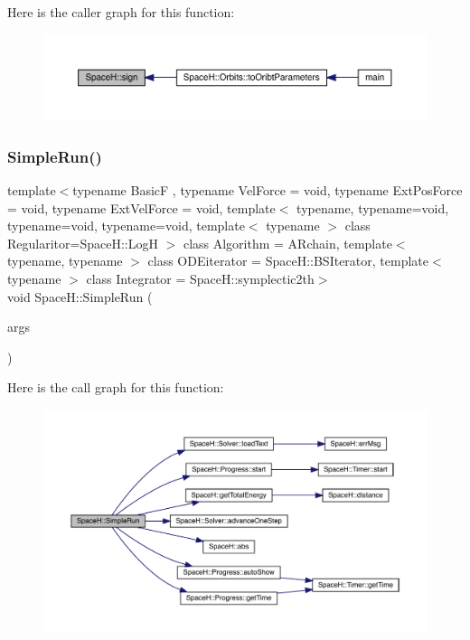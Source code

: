 Here is the caller graph for this function\+:
\nopagebreak
\begin{figure}[H]
\begin{center}
\leavevmode
\includegraphics[width=350pt]{namespace_space_h_a14683e2d8fb2395aa4821be534fb8b15_icgraph}
\end{center}
\end{figure}
\mbox{\label{namespace_space_h_aadf57dac888f5b6e80de5ef3f27733dc}} 
\subsubsection{\texorpdfstring{Simple\+Run()}{SimpleRun()}}
{\footnotesize\ttfamily template$<$typename BasicF , typename Vel\+Force  = void, typename Ext\+Pos\+Force  = void, typename Ext\+Vel\+Force  = void, template$<$ typename, typename=void, typename=void, typename=void, template$<$ typename $>$ class Regularitor=\+Space\+H\+::\+Log\+H $>$ class Algorithm = A\+Rchain, template$<$ typename, typename $>$ class O\+D\+Eiterator = Space\+H\+::\+B\+S\+Iterator, template$<$ typename $>$ class Integrator = Space\+H\+::symplectic2th$>$ \\
void Space\+H\+::\+Simple\+Run (\begin{DoxyParamCaption}\item[{\mbox{\hyperlink{struct_space_h_1_1_run_args}{Run\+Args}} \&}]{args }\end{DoxyParamCaption})}

Here is the call graph for this function\+:
\nopagebreak
\begin{figure}[H]
\begin{center}
\leavevmode
\includegraphics[width=350pt]{namespace_space_h_aadf57dac888f5b6e80de5ef3f27733dc_cgraph}
\end{center}
\end{figure}
\mbox{\label{namespace_space_h_acb1ae0f3496d4c85d444895d61bfae15}} 
